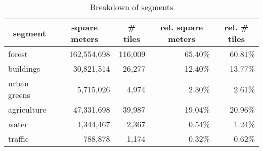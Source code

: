 \begin{table}[h]
\centering
\begin{tabular}{|l|r|r|r|r|}
\hline
  \multicolumn{1}{|c|}{\textbf{segment}} &
  \multicolumn{1}{c|}{\textbf{square meters}} &
  \multicolumn{1}{c|}{\textbf{\# tiles}} &
  \multicolumn{1}{c|}{\textbf{rel. square meters}} &
  \multicolumn{1}{c|}{\textbf{rel. \# tiles}} \\ \hline
forest       & 162,554,698 & 116,009 & 65.40\% & 60.81\% \\ \hline
buildings    & 30,821,514  & 26,277  & 12.40\% & 13.77\% \\ \hline
urban greens & 5,715,026   & 4,974   & 2.30\%  & 2.61\%  \\ \hline
agriculture  & 47,331,698  & 39,987  & 19.04\% & 20.96\% \\ \hline
water        & 1,344,467   & 2,367   & 0.54\%  & 1.24\%  \\ \hline
traffic      & 788,878     & 1,174   & 0.32\%  & 0.62\%  \\ \hline
\end{tabular}
\caption{Breakdown of segments}
\label{tab:seg-breakdown-unet}
\end{table}

\newpage
